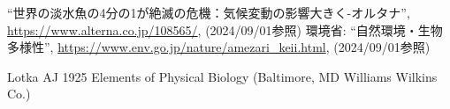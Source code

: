 \documentclass[twocolumn,10pt,a4j]{ltjsarticle}
\begin{document}
\begin{thebibliography}{99}
``世界の淡水魚の4分の1が絶滅の危機：気候変動の影響大きく-オルタナ'', 
\url{https://www.alterna.co.jp/108565/}, (2024/09/01参照)
 環境省: ``自然環境・生物多様性'', 
\url{https://www.env.go.jp/nature/amezari_keii.html}, (2024/09/01参照)


 Lotka AJ 1925 Elements of Physical Biology (Baltimore, MD Williams  Wilkins Co.)





\end{thebibliography}
\end{document}

